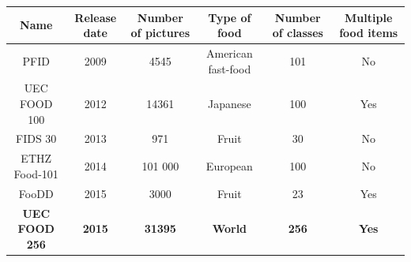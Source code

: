 \documentclass[aspectratio=169]{beamer}
\newenvironment{myframe}[1][t]{\begin{frame}[#1]{\secname}{\subsecname}}{\end{frame}}
\begin{document}
     \begin{myframe}
         \begin{center}
             \renewcommand{\arraystretch}{1.3} %
             \begin{tabulary}{\textwidth}{|| c | C C C C C||}
                 \hline
                 Name & Release date & Number of pictures & Type of food & Number of classes & Multiple food items \\
                 \hline\hline
                 PFID \cite{Chen2009} & 2009 & 4545 & American fast-food  & 101 & No \\
                 \hline
                 UEC FOOD 100 \cite{Matsuda2012a} & 2012 & 14361 & Japanese & 100  & Yes \\
                 \hline
                 FIDS 30 \cite{FIDS30} & 2013 & 971 & Fruit & 30 & No \\
                 \hline
                 ETHZ Food-101 \cite{Bossard2014} & 2014 & 101 000 & European & 100 & No \\
                 \hline
                 FooDD \cite{ParisaPouladzadehAbdulsalamYassine2015} & 2015 & 3000 & Fruit & 23 & Yes \\
                 \hline
                 \textbf{UEC FOOD 256} \cite{Kawano2015} & \textbf{2015} & \textbf{31395} & \textbf{World} & \textbf{256}  & \textbf{Yes} \\ 
                 \hline
             \end{tabulary}
        \end{center}
    \end{myframe}
    
\end{document}
